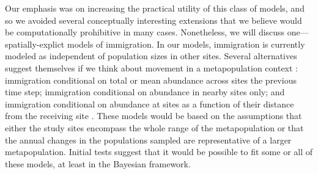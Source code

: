 \documentclass[12pt,english]{article}
\begin{document}
\begin{spacing}{1.9}
\begin{flushleft}
Our emphasis was on increasing the practical utility of this
class of models, and so we avoided several conceptually interesting
extensions that we believe would be computationally prohibitive in many
cases. Nonetheless, we will discuss one---spatially-explict models of
immigration. 
In our models, immigration is currently modeled as independent of
population sizes in other sites. Several alternatives suggest
themselves if we think about movement in a metapopulation
context \citep{hanski:1998}: immigration conditional on total or mean
abundance across sites the previous time step; immigration
conditional on abundance in nearby sites only; and immigration
conditional on abundance at sites as a function of their distance
from the receiving site \citep{hastings:1991,hanski:1998}. These models would
be based on the assumptions that either the study sites
encompass the whole range of the metapopulation or that the
annual changes in the populations sampled are representative of
a larger metapopulation. Initial tests suggest that it would be
possible to fit some or all of these models, at least in the
Bayesian framework.

\end{flushleft}
\end{spacing}
\end{document}
